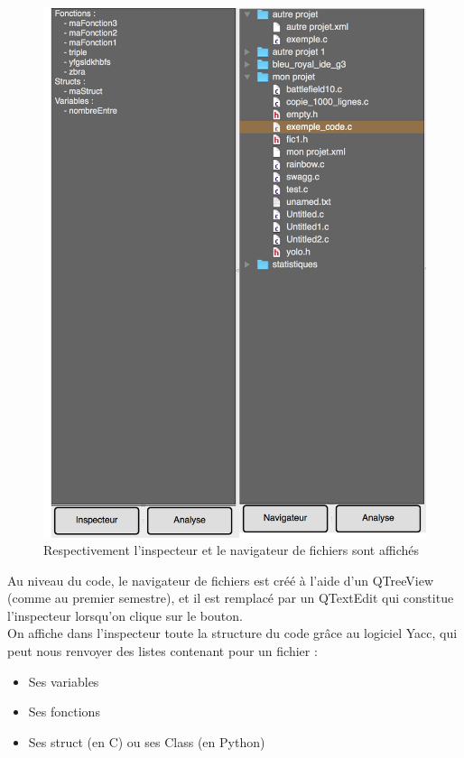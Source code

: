 \documentclass[a4paper,12pt]{article}
\begin{document}
	\begin{figure}[h!]
		\begin{center}
			\includegraphics[scale=0.5]{images/insp_nav.png}
			\caption{Respectivement l'inspecteur et le navigateur de fichiers sont affichés}
		\end{center}
	\end{figure}
	
	Au niveau du code, le navigateur de fichiers est créé à l'aide d'un QTreeView (comme au premier semestre), et il est remplacé par un QTextEdit qui constitue l'inspecteur lorsqu'on clique sur le bouton.\\
	
	On affiche dans l'inspecteur toute la structure du code grâce au logiciel Yacc, qui peut nous renvoyer des listes contenant pour un fichier :
	
	\begin{itemize}
		\item Ses variables
		\item Ses fonctions
		\item Ses struct (en C) ou ses Class (en Python)\\
	\end{itemize}
	
\end{document}
